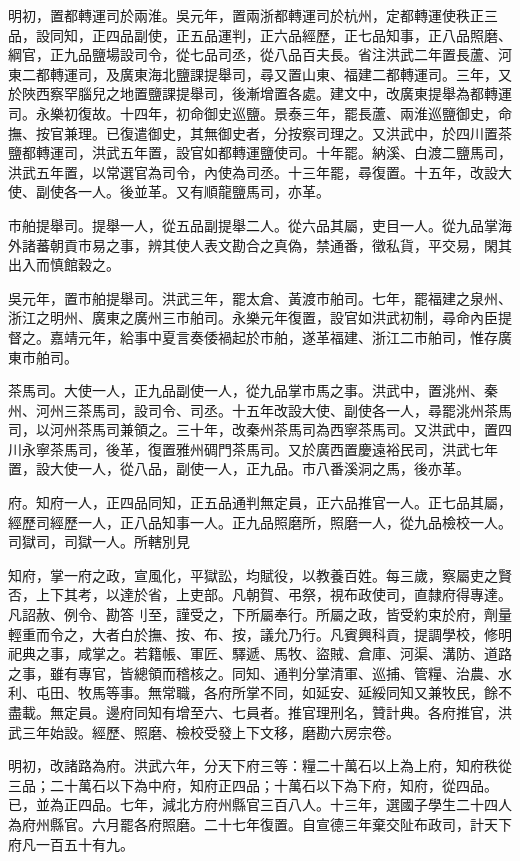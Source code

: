 明初，置都轉運司於兩淮。吳元年，置兩浙都轉運司於杭州，定都轉運使秩正三品，設同知，正四品副使，正五品運判，正六品經歷，正七品知事，正八品照磨、綱官，正九品鹽場設司令，從七品司丞，從八品百夫長。省注洪武二年置長蘆、河東二都轉運司，及廣東海北鹽課提舉司，尋又置山東、福建二都轉運司。三年，又於陜西察罕腦兒之地置鹽課提舉司，後漸增置各處。建文中，改廣東提舉為都轉運司。永樂初復故。十四年，初命御史巡鹽。景泰三年，罷長蘆、兩淮巡鹽御史，命撫、按官兼理。已復遣御史，其無御史者，分按察司理之。又洪武中，於四川置茶鹽都轉運司，洪武五年置，設官如都轉運鹽使司。十年罷。納溪、白渡二鹽馬司，洪武五年置，以常選官為司令，內使為司丞。十三年罷，尋復置。十五年，改設大使、副使各一人。後並革。又有順龍鹽馬司，亦革。

市舶提舉司。提舉一人，從五品副提舉二人。從六品其屬，吏目一人。從九品掌海外諸蕃朝貢市易之事，辨其使人表文勘合之真偽，禁通番，徵私貨，平交易，閑其出入而慎館穀之。

吳元年，置市舶提舉司。洪武三年，罷太倉、黃渡市舶司。七年，罷福建之泉州、浙江之明州、廣東之廣州三市舶司。永樂元年復置，設官如洪武初制，尋命內臣提督之。嘉靖元年，給事中夏言奏倭禍起於市舶，遂革福建、浙江二市舶司，惟存廣東市舶司。

茶馬司。大使一人，正九品副使一人，從九品掌市馬之事。洪武中，置洮州、秦州、河州三茶馬司，設司令、司丞。十五年改設大使、副使各一人，尋罷洮州茶馬司，以河州茶馬司兼領之。三十年，改秦州茶馬司為西寧茶馬司。又洪武中，置四川永寧茶馬司，後革，復置雅州碉門茶馬司。又於廣西置慶遠裕民司，洪武七年置，設大使一人，從八品，副使一人，正九品。市八番溪洞之馬，後亦革。

府。知府一人，正四品同知，正五品通判無定員，正六品推官一人。正七品其屬，經歷司經歷一人，正八品知事一人。正九品照磨所，照磨一人，從九品檢校一人。司獄司，司獄一人。所轄別見

知府，掌一府之政，宣風化，平獄訟，均賦役，以教養百姓。每三歲，察屬吏之賢否，上下其考，以達於省，上吏部。凡朝賀、弔祭，視布政使司，直隸府得專達。凡詔赦、例令、勘答刂至，謹受之，下所屬奉行。所屬之政，皆受約束於府，劑量輕重而令之，大者白於撫、按、布、按，議允乃行。凡賓興科貢，提調學校，修明祀典之事，咸掌之。若籍帳、軍匠、驛遞、馬牧、盜賊、倉庫、河渠、溝防、道路之事，雖有專官，皆總領而稽核之。同知、通判分掌清軍、巡捕、管糧、治農、水利、屯田、牧馬等事。無常職，各府所掌不同，如延安、延綏同知又兼牧民，餘不盡載。無定員。邊府同知有增至六、七員者。推官理刑名，贊計典。各府推官，洪武三年始設。經歷、照磨、檢校受發上下文移，磨勘六房宗卷。

明初，改諸路為府。洪武六年，分天下府三等：糧二十萬石以上為上府，知府秩從三品；二十萬石以下為中府，知府正四品；十萬石以下為下府，知府，從四品。已，並為正四品。七年，減北方府州縣官三百八人。十三年，選國子學生二十四人為府州縣官。六月罷各府照磨。二十七年復置。自宣德三年棄交阯布政司，計天下府凡一百五十有九。

